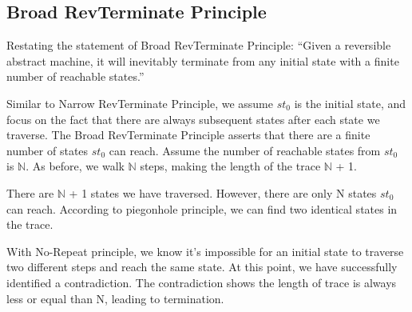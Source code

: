 \subsection{ Broad RevTerminate Principle }
Restating the statement of Broad RevTerminate Principle: 
``Given a reversible abstract machine, it will inevitably terminate from any initial state with a finite number of reachable states.''

Similar to Narrow RevTerminate Principle, we assume $st_{0}$ is the initial state, and focus on the fact that there are always subsequent states after each state we traverse.
The Broad RevTerminate Principle asserts that there are a finite number of states $st_{0}$ can reach. 
Assume the number of reachable states from $st_{0}$ is $\mathbb{N}$.
As before, we walk $\mathbb{N}$ steps, making the length of the trace $\mathbb{N}$ + 1.



There are $\mathbb{N}$ + 1 states we have traversed.  However, there are only N states $st_{0}$ can reach.
According to piegonhole principle, we can find two identical states in the trace.



With No-Repeat principle, we know it's impossible for an initial state to traverse two different steps and reach the same state.
At this point, we have successfully identified a contradiction.  The contradiction shows the length of trace is always less or equal than N, leading to termination.

